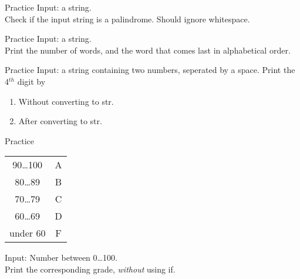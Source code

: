 \documentclass{beamer}
\begin{document}
\begin{frame}{Practice}
  Input: a string. \\
  Check if the input string is a palindrome. Should ignore whitespace.
\end{frame}

\begin{frame}{Practice}
  Input: a string. \\
  Print the number of words, and the word that comes last in
  alphabetical order.
\end{frame}

\begin{frame}{Practice}
  Input: a string containing two numbers, seperated by a space.
  Print the 4$^{th}$ digit by
  \begin{enumerate}
    \item Without converting to str.
    \item After converting to str.
  \end{enumerate}
\end{frame}

\begin{frame}{Practice}
    \begin{tabular}{c c}
      90\ldots100 & A \\
      80\ldots89 & B \\
      70\ldots79 & C \\
      60\ldots69 & D \\
      under 60 & F
    \end{tabular}
    \bigskip

    Input: Number between 0\ldots100.\\
    Print the corresponding grade, \textit{without} using if.
\end{frame}
\end{document}
